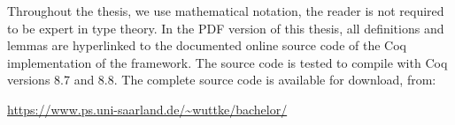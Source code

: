 Throughout the thesis, we use mathematical notation, the reader is not required to be expert in type theory.  In the PDF version of this thesis, all
definitions and lemmas are hyperlinked to the documented online source code of the Coq implementation of the framework.  The source code is tested to
compile with Coq versions 8.7 and 8.8.  The complete source code is available for download, from:
\begin{center}
  \url{https://www.ps.uni-saarland.de/~wuttke/bachelor/}
\end{center}

